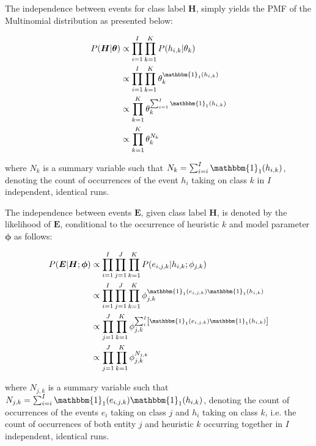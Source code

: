 \documentclass[preprint,review,12pt]{elsarticle}
\begin{document}
The independence between events for class label $\boldsymbol{H}$, simply yields the \ac{PMF} of the Multinomial distribution as presented below:

\begin{equation}
	\label{eq:bhh:selection_mechanism:naive_bayes:h_pmf}
	\begin{split}
		P(\boldsymbol{H} \vert \boldsymbol{\theta})
		&\propto \prod_{i=1}^{I} \prod_{k=1}^{K} P(h_{i,k} \vert \theta_{k}) \\
		&\propto \prod_{i=1}^{I} \prod_{k=1}^{K} \theta_{k}^{\mathbbm{1}_{1}(h_{i,k})} \\
		&\propto \prod_{k=1}^{K} \theta_{k}^{\sum_{i=1}^{I} \mathbbm{1}_{1}(h_{i,k})} \\
		&\propto \prod_{k=1}^{K} \theta_{k}^{N_{k}}
	\end{split}
\end{equation}

where $N_{k}$ is a summary variable such that $N_{k} = \sum_{i=i}^{I} \mathbbm{1}_{1}(h_{i,k})$, denoting the count of occurrences of the event $h_{i}$ taking on class $k$ in $I$ independent, identical runs.

The independence between events $\boldsymbol{E}$, given class label $\boldsymbol{H}$, is denoted by the likelihood of $\boldsymbol{E}$, conditional to the occurrence of heuristic $k$ and model parameter $\boldsymbol{\phi}$ as follows:

\begin{equation}
	\label{eq:bhh:selection_mechanism:naive_bayes:EgH_pmf}
	\begin{split}
		P(\boldsymbol{E} \vert \boldsymbol{H};  \boldsymbol{\phi})
		&\propto \prod_{i=1}^{I} \prod_{j=1}^{J} \prod_{k=1}^{K} P(e_{i,j,k} \vert h_{i,k} ; \phi_{j,k})  \\
		&\propto \prod_{i=1}^{I} \prod_{j=1}^{J} \prod_{k=1}^{K} \phi_{j,k}^{\mathbbm{1}_{1}(e_{i,j,k})\mathbbm{1}_{1}(h_{i,k})} \\
		&\propto \prod_{j=1}^{J} \prod_{k=1}^{K} \phi_{j,k}^{ \sum_{i}^{I} \left[ \mathbbm{1}_{1}(e_{i,j,k}) \mathbbm{1}_{1}(h_{i,k}) \right]} \\
		&\propto \prod_{j=1}^{J} \prod_{k=1}^{K} \phi_{j,k}^{N_{j,k}}
	\end{split}
\end{equation}

where $N_{j,k}$ is a summary variable such that $N_{j,k} = \sum_{i=i}^{I} \mathbbm{1}_{1}(e_{i,j,k})\mathbbm{1}_{1}(h_{i,k})$, denoting the count of occurrences of the events $e_{i}$ taking on class $j$ and $h_{i}$ taking on class $k$, i.e. the count of occurrences of both entity $j$ and heuristic $k$ occurring together in $I$ independent, identical runs.
\end{document}
